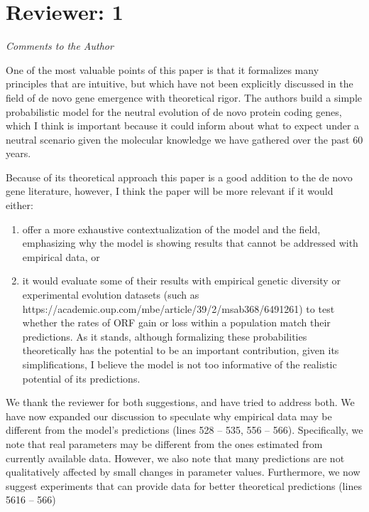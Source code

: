 \documentclass[12pt,a4paper]{article}
\begin{document}
\section*{Reviewer: 1}

{\itshape Comments to the Author

One of the most valuable points of this paper is that it formalizes many principles that are intuitive, but which have not been explicitly discussed in the field of de novo gene emergence with theoretical rigor. The authors build a simple probabilistic model for the neutral evolution of de novo protein coding genes, which I think is important because it could inform about what to expect under a neutral scenario given the molecular knowledge we have gathered over the past 60 years.

Because of its theoretical approach this paper is a good addition to the de novo gene literature, however, I think the paper will be more relevant if it would either:

\begin{enumerate}
\item offer a more exhaustive contextualization of the model and the field, emphasizing why the model is showing results that cannot be addressed with empirical data, or

\item it would evaluate some of their results with empirical genetic diversity or experimental evolution datasets (such as https://academic.oup.com/mbe/article/39/2/msab368/6491261) to test whether the rates of ORF gain or loss within a population match their predictions. As it stands, although formalizing these probabilities theoretically has the potential to be an important contribution, given its simplifications, I believe the model is not too informative of the realistic potential of its predictions.
\end{enumerate}
}

We thank the reviewer for both suggestions, and have tried to address both. We have now expanded our discussion to speculate why empirical data may be different from the model's predictions (lines 528 -- 535, 556 -- 566). Specifically, we note that real parameters may be different from the ones estimated from currently available data. However, we also note that many predictions are not qualitatively affected by small changes in parameter values. Furthermore, we now suggest experiments that can provide data for better theoretical predictions (lines 5616 -- 566)
\end{document}
